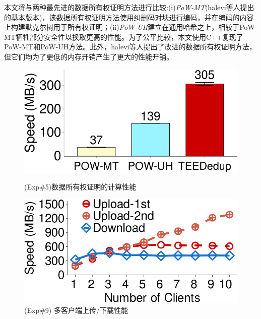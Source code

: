 本文将\sysnameS 与两种最先进的数据所有权证明方法进行比较:(i)\textit{PoW-MT}\cite{halevi11}(halevi等人提出的基本版本)，该数据所有权证明方法使用纠删码对块进行编码，并在编码的内容上构建默克尔树用于所有权证明；(ii)\textit{PoW-UH}\cite{xu2013weak}建立在通用哈希之上，相较于PoW-MT牺牲部分安全性以换取更高的性能。为了公平比较，本文使用C++复现了PoW-MT和PoW-UH方法。此外，halevi等人\cite{halevi11}提出了改进的数据所有权证明方法，但它们均为了更低的内存开销产生了更大的性能开销。

\begin{figure}[!htb]
    \begin{minipage}[t]{0.47\textwidth}
        \centering
        \includegraphics[width=\linewidth]{pic/sgxdedup/expa4_powPerformance.pdf}
        \caption{\small(Exp\#5)数据所有权证明的计算性能}
        \label{fig:sgxdedup-pow-comparison}
        \end{minipage}%
    \hspace{0.2in}
    \begin{minipage}[t]{0.47\textwidth}
        \centering
        \includegraphics[width=\linewidth]{pic/sgxdedup/expb1_multiple_client.pdf}  
        \caption{(Exp\#9) 多客户端上传/下载性能}
        \label{fig:sgxdedup-multiClientThroughput}
    \end{minipage}%
\end{figure}

